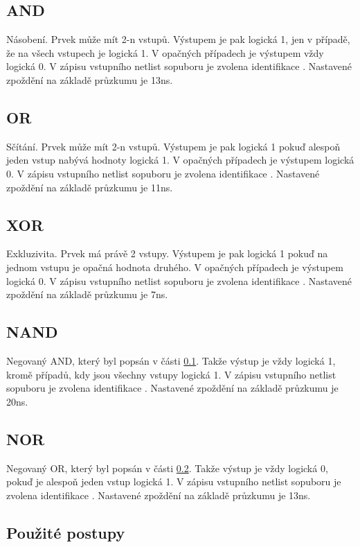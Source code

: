 \documentclass[11pt,a4paper]{article}
\begin{document}
			\subsection{AND}
				\label{and}
				Násobení. Prvek může mít 2-n vstupů. Výstupem je pak logická 1, jen v případě, že na všech vstupech je logická 1. V opačných případech je výstupem vždy logická 0. V zápisu vstupního netlist sopuboru je zvolena identifikace .  Nastavené zpoždění na základě průzkumu je 13ns\cite{andSheet}.

			\subsection{OR}
				\label{or}
				Sčítání. Prvek může mít 2-n vstupů. Výstupem je pak logická 1 pokuď alespoň jeden vstup nabývá hodnoty logická 1. V opačných případech je výstupem logická 0. V zápisu vstupního netlist sopuboru je zvolena identifikace .  Nastavené zpoždění na základě průzkumu je 11ns\cite{orSheet}.

			\subsection{XOR}
				Exkluzivita. Prvek má právě 2 vstupy. Výstupem je pak logická 1 pokuď na jednom vstupu je opačná hodnota druhého. V opačných případech je výstupem logická 0. V zápisu vstupního netlist sopuboru je zvolena identifikace .  Nastavené zpoždění na základě průzkumu je 7ns\cite{xorSheet}.

			\subsection{NAND}
				Negovaný AND, který byl popsán v části \ref{and}. Takže výstup je vždy logická 1, kromě případů, kdy jsou všechny vstupy logická 1. V zápisu vstupního netlist sopuboru je zvolena identifikace . Nastavené zpoždění na základě průzkumu je 20ns\cite{nandSheet}.

			\subsection{NOR}
				Negovaný OR, který byl popsán v části \ref{or}. Takže výstup je vždy logická 0, pokuď je alespoň jeden vstup logická 1. V zápisu vstupního netlist sopuboru je zvolena identifikace .  Nastavené zpoždění na základě průzkumu je 13ns\cite{norSheet}.


		\subsection{Použité postupy}
\end{document}
